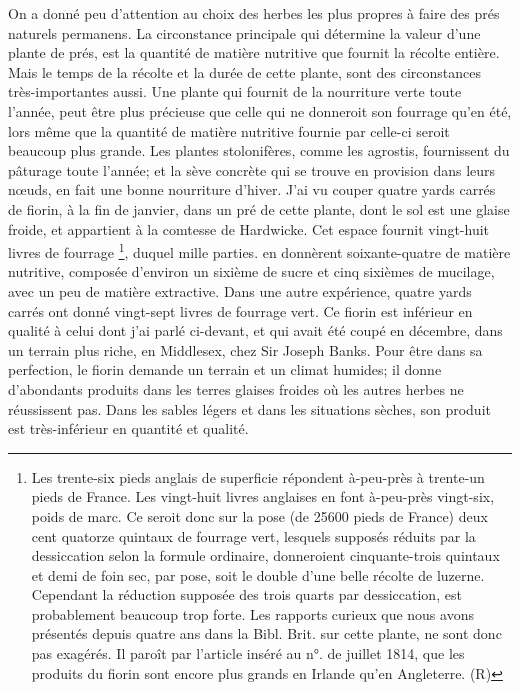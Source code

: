 \setcounter{page}{289} On a donné peu d'attention au choix des herbes les plus propres à faire des prés naturels permanens. La circonstance principale qui détermine la valeur d'une plante de prés, est la quantité de matière nutritive que fournit la récolte entière. Mais le temps de la récolte et la durée de cette plante, sont des circonstances très-importantes aussi. Une plante qui fournit de la nourriture verte toute l'année, peut être plus précieuse que celle qui ne donneroit son fourrage qu'en été, lors même que la quantité de matière nutritive fournie par celle-ci seroit beaucoup plus grande.
Les plantes stolonifères, comme les agrostis, fournissent du pâturage toute l'année; et la sève concrète qui se trouve en provision dans leurs nœuds, en fait une bonne nourriture d'hiver. J'ai vu couper quatre yards carrés de fiorin, à la fin de janvier, dans un pré de cette plante, dont le sol est une glaise froide, et appartient à la comtesse de Hardwicke. Cet espace fournit vingt-huit livres de fourrage \footnote{Les trente-six pieds anglais de superficie répondent à-peu-près à trente-un pieds de France. Les vingt-huit livres anglaises en font à-peu-près vingt-six, poids de marc. Ce seroit donc sur la pose (de 25600 pieds de France) deux cent quatorze quintaux de fourrage vert, lesquels supposés réduits par la dessiccation selon la formule ordinaire, donneroient cinquante-trois quintaux et demi de foin sec, par pose, soit le double d'une belle récolte de luzerne. Cependant la réduction supposée des trois quarts par dessiccation, est probablement beaucoup trop forte. Les rapports curieux que nous avons présentés depuis quatre ans dans la Bibl. Brit. sur cette plante, ne sont donc pas exagérés. Il paroît par l'article inséré au n°. de juillet 1814, que les produits du fiorin sont encore plus grands en Irlande qu'en Angleterre. (R)}, duquel mille parties.\setcounter{page}{290} en donnèrent soixante-quatre de matière nutritive, composée d'environ un sixième de sucre et cinq sixièmes de mucilage, avec un peu de matière extractive. Dans une autre expérience, quatre yards carrés ont donné vingt-sept livres de fourrage vert. Ce fiorin est inférieur en qualité à celui dont j'ai parlé ci-devant, et qui avait été coupé en décembre, dans un terrain plus riche, en Middlesex, chez Sir Joseph Banks.
Pour être dans sa perfection, le fiorin demande un terrain et un climat humides; il donne d'abondants produits dans les terres glaises froides où les autres herbes ne réussissent pas. Dans les sables légers et dans les situations sèches, son produit est très-inférieur en quantité et qualité.
